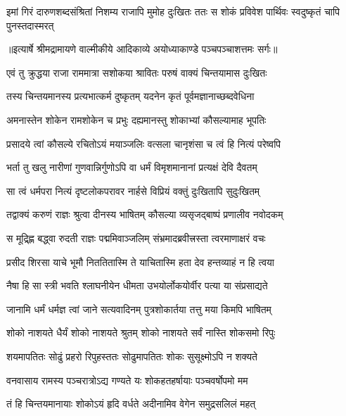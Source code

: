 \fourlineindentedshloka
{इमां गिरं दारुणशब्दसंश्रितां}
{ निशम्य राजापि मुमोह दुःखितः}
{ततः स शोकं प्रविवेश पार्थिवः}
{ स्वदुष्कृतं चापि पुनस्तदास्मरत्} %


{॥इत्यार्षे श्रीमद्रामायणे वाल्मीकीये आदिकाव्ये अयोध्याकाण्डे पञ्चपञ्चाशत्तमः सर्गः॥}


\twolineshloka
{एवं तु क्रुद्धया राजा राममात्रा सशोकया}
{श्रावितः परुषं वाक्यं चिन्तयामास दुःखितः} %

\twolineshloka
{तस्य चिन्तयमानस्य प्रत्यभात्कर्म दुष्कृतम्}
{यदनेन कृतं पूर्वमज्ञानाच्छब्दवेधिना} %

\twolineshloka
{अमनास्तेन शोकेन रामशोकेन च प्रभुः}
{दह्यमानस्तु शोकाभ्यां कौसल्यामाह भूपतिः} %

\twolineshloka
{प्रसादये त्वां कौसल्ये रचितोऽयं मयाञ्जलिः}
{वत्सला चानृशंसा च त्वं हि नित्यं परेष्वपि} %

\twolineshloka
{भर्ता तु खलु नारीणां गुणवान्निर्गुणोऽपि वा}
{धर्मं विमृशमानानां प्रत्यक्षं देवि दैवतम्} %

\twolineshloka
{सा त्वं धर्मपरा नित्यं दृष्टलोकपरावर}
{नार्हसे विप्रियं वक्तुं दुःखितापि सुदुःखितम्} %

\twolineshloka
{तद्वाक्यं करुणं राज्ञः श्रुत्वा दीनस्य भाषितम्}
{कौसल्या व्यसृजद्बाष्पं प्रणालीव नवोदकम्} %

\twolineshloka
{स मूद्र्ह्णि बद्ध्वा रुदती राज्ञः पद्ममिवाञ्जलिम्}
{संभ्रमादब्रवीत्त्रस्ता त्वरमाणाक्षरं वचः} %

\twolineshloka
{प्रसीद शिरसा याचे भूमौ निततितास्मि ते}
{याचितास्मि हता देव हन्तव्याहं न हि त्वया} %

\twolineshloka
{नैषा हि सा स्त्री भवति श्लाघनीयेन धीमता}
{उभयोर्लोकयोर्वीर पत्या या संप्रसाद्यते} %

\twolineshloka
{जानामि धर्मं धर्मज्ञ त्वां जाने सत्यवादिनम्}
{पुत्रशोकार्तया तत्तु मया किमपि भाषितम्} %

\twolineshloka
{शोको नाशयते धैर्यं शोको नाशयते श्रुतम्}
{शोको नाशयते सर्वं नास्ति शोकसमो रिपुः} %

\twolineshloka
{शयमापतितः सोढुं प्रहरो रिपुहस्ततः}
{सोढुमापतितः शोकः सुसूक्ष्मोऽपि न शक्यते} %

\twolineshloka
{वनवासाय रामस्य पञ्चरात्रोऽद्य गण्यते}
{यः शोकहतहर्षायाः पञ्चवर्षोपमो मम} %

\twolineshloka
{तं हि चिन्तयमानायाः शोकोऽयं हृदि वर्धते}
{अदीनामिव वेगेन समुद्रसलिलं महत्} %

